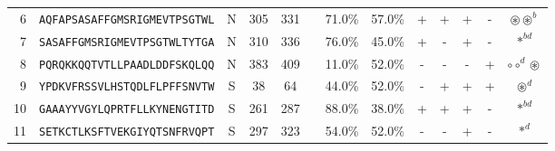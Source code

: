 \begin{tabular}{rcccccccccccc}
6  &  \texttt{AQFAPSASAFFGMSRIGMEVTPSGTWL} &       N &    305 &   331 &                                                                  &                          71.0\% &                           57.0\% &          + &           + &          + &           - &                                                                                                                  $ \circledast \circledast^b $ \\
7  &  \texttt{SASAFFGMSRIGMEVTPSGTWLTYTGA} &       N &    310 &   336 &                                                                  &                          76.0\% &                           45.0\% &          + &           - &          + &           - &                                                                                                                                  $ \ast^{bd} $ \\
8  &  \texttt{PQRQKKQQTVTLLPAADLDDFSKQLQQ} &       N &    383 &   409 &                                                                  &                          11.0\% &                           52.0\% &          - &           - &          - &           + &                                                                                                                  $ \circ \circ^d \circledast $ \\
9  &  \texttt{YPDKVFRSSVLHSTQDLFLPFFSNVTW} &       S &     38 &    64 &                                                                  &                          44.0\% &                           52.0\% &          - &           + &          + &           + &                                                                                                                              $ \circledast^d $ \\
10 &  \texttt{GAAAYYVGYLQPRTFLLKYNENGTITD} &       S &    261 &   287 &                                                                  &                          88.0\% &                           38.0\% &          + &           + &          + &           - &                                                                                                                                  $ \ast^{bd} $ \\
11 &  \texttt{SETKCTLKSFTVEKGIYQTSNFRVQPT} &       S &    297 &   323 &                                                                  &                          54.0\% &                           52.0\% &          - &           - &          + &           - &                                                                                                                                     $ \ast^d $ \\

\end{tabular}
